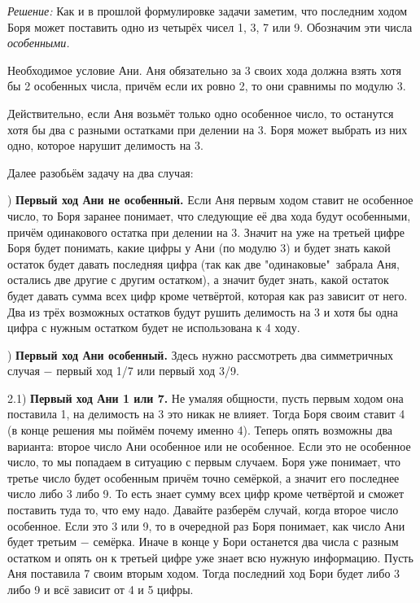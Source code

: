  \newpage

\hspace{3mm}


 \textit{Решение:} Как и в прошлой формулировке задачи заметим, что последним ходом Боря может поставить одно из четырёх чисел 1, 3, 7 или 9. Обозначим эти числа \textit{особенными.} 

 $\textit{Необходимое условие Ани.}$ Аня обязательно за 3 своих хода должна взять хотя бы 2 особенных числа, причём если их ровно 2, то они сравнимы по модулю 3.
 
 Действительно, если Аня возьмёт только одно особенное число, то останутся хотя бы два с разными остатками при делении на 3. Боря может выбрать из них одно, которое нарушит делимость на 3.

 Далее разобьём задачу на два случая:

 ) \textbf{Первый ход Ани не особенный.} Если Аня первым ходом ставит не особенное число, то Боря заранее понимает, что следующие её два хода будут особенными, причём одинакового остатка при делении на 3. Значит на уже на третьей цифре Боря будет понимать, какие цифры у Ани (по модулю 3) и будет знать какой остаток будет давать последняя цифра (так как две "одинаковые"\ забрала Аня, остались две другие с другим остатком), а значит будет знать, какой остаток будет давать сумма всех цифр кроме четвёртой, которая как раз зависит от него. Два из трёх возможных остатков будут рушить делимость на 3 и хотя бы одна цифра с нужным остатком будет не использована к 4 ходу.

 ) \textbf{Первый ход Ани особенный.} Здесь нужно рассмотреть два симметричных случая $-$ первый ход 1/7 или первый ход 3/9.

2.1) \textbf{Первый ход Ани 1 или 7.}  Не умаляя общности, пусть первым ходом она поставила 1, на делимость на 3 это никак не влияет. Тогда Боря своим ставит 4 (в конце решения мы поймём почему именно 4). Теперь опять возможны два варианта: второе число Ани особенное или не особенное. Если это не особенное число, то мы попадаем в ситуацию с первым случаем. Боря уже понимает, что третье число будет особенным причём точно семёркой, а значит его последнее число либо 3 либо 9. То есть знает сумму всех цифр кроме четвёртой и сможет поставить туда то, что ему надо. Давайте разберём случай, когда второе число особенное. Если это 3 или 9, то в очередной раз Боря понимает, как число Ани будет третьим $-$ семёрка. Иначе в конце у Бори останется два числа с разным остатком и опять он к третьей цифре уже знает всю нужную информацию. Пусть Аня поставила 7 своим вторым ходом. Тогда последний ход Бори будет либо 3 либо 9 и всё зависит от 4 и 5 цифры. 

